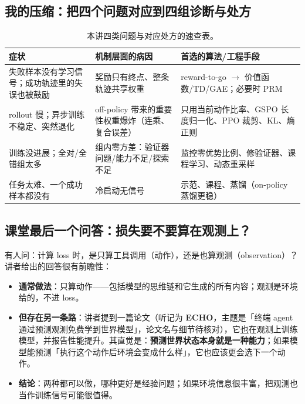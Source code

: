 \documentclass[a4paper]{article}
\begin{document}
\subsection{我的压缩：把四个问题对应到四组诊断与处方}

\begin{table}[H]
\centering
\small
\begin{tabular}{@{}p{}p{}p{}@{}}
\toprule
\textbf{症状} & \textbf{机制层面的病因} & \textbf{首选的算法/工程手段} \\
\midrule
失败样本没有学习信号；成功轨迹里的失误也被鼓励 & 奖励只有终点、整条轨迹共享权重 & reward-to-go $\rightarrow$ 价值函数/TD/GAE；必要时 PRM \\
rollout 慢；异步训练不稳定、突然退化 & off-policy 带来的重要性权重爆炸（连乘、复合误差） & 只用当前动作比率、GSPO 长度归一化、PPO 裁剪、KL、熵正则 \\
训练没进展；全对/全错组太多 & 组内零方差：验证器问题/能力不足/探索不足 & 监控零优势比例、修验证器、课程学习、动态重采样 \\
任务太难、一个成功样本都没有 & 冷启动无信号 & 示范、课程、蒸馏（on-policy 蒸馏更稳） \\
\bottomrule
\end{tabular}
\caption{本讲四类问题与对应处方的速查表。}
\end{table}

\subsection{课堂最后一个问答：损失要不要算在观测上？}

有人问：计算 loss 时，是只算工具调用（动作），还是也算观测（observation）？讲者给出的回答很有前瞻性：

\begin{itemize}
\item \textbf{通常做法}：只算动作——包括模型的思维链和它生成的所有内容；观测是环境给的，不进 loss。
\item \textbf{但存在另一条路}：讲者提到一篇论文（听记为 \textbf{ECHO}，主题是「终端 agent 通过预测观测免费学到世界模型」，论文名与细节待核对），它\underline{也}在观测上训练模型，并报告性能提升。其直觉是：\textbf{预测世界状态本身就是一种能力}；如果模型能预测「执行这个动作后环境会变成什么样」，它也应该更会选下一个动作。
\item \textbf{结论}：两种都可以做，哪种更好是经验问题；如果环境信息很丰富，把观测也当作训练信号可能很值得。
\end{itemize}
\end{document}

